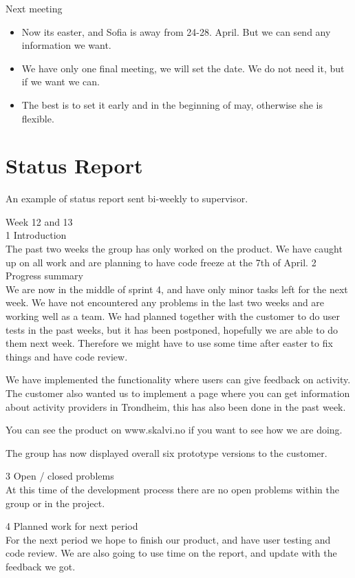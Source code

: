 {\large{Next meeting}}
\begin{itemize}  
    \item Now its easter, and Sofia is away from 24-28. April. But we can send any information we want. 
    \item We have only one final meeting, we will set the date. We do not need it, but if we want we can. 
    \item The best is to set it early and in the beginning of may, otherwise she is flexible. 
\end{itemize}


\section{Status Report}
\label{status_report}

An example of status report sent bi-weekly to supervisor.

{\Large{Week 12 and 13}}\\

{\large{1 Introduction}}\\
The past two weeks the group has only worked on the product. We have caught up on all work and are planning to have code freeze at the 7th of April.			
{\large{2 Progress summary}}\\					
We are now in the middle of sprint 4, and have only minor tasks left for the next week. We have not encountered any problems in the last two weeks and are working well as a team.  We had planned together with the customer to do user tests in the past weeks, but it has been postponed, hopefully we are able to do them next week. Therefore we might have to use some time after easter to fix things and have code review. 

We have implemented the functionality where users can give feedback on activity. The customer also wanted us to implement a page where you can get information about activity providers in Trondheim, this has also been done in the past week.

You can see the product on www.skalvi.no if you want to see how we are doing. 

The group has now displayed overall six prototype versions to the customer. 

{\large{3 Open / closed problems}}\\
At this time of the development process there are no open problems within the group or in the project.

{\large{4 Planned work for next period}}\\
For the next period we hope to finish our product, and have user testing and code review. We are also going to use time on the report, and update with the feedback we got.

